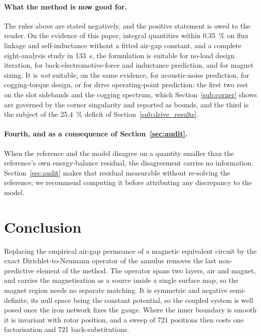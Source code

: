 \documentclass[10pt,a4paper,twocolumn]{article}
\theoremstyle{plain}
\theoremstyle{remark}
\begin{document}
\paragraph{What the method is now good for.}
The rules above are stated negatively, and the positive statement is
owed to the reader. On the evidence of this paper, integral quantities
within \SI{0.35}{\percent} on flux linkage and self-inductance without a
fitted air-gap constant, and a complete eight-analysis study in
\SI{133}{\second}, the formulation is suitable for no-load design
iteration, for back-electromotive-force and inductance prediction, and
for magnet sizing. It is \emph{not} suitable, on the same evidence, for
acoustic-noise prediction, for cogging-torque design, or for drive
operating-point prediction: the first two rest on the slot sidebands and
the cogging spectrum, which Section~\ref{sub:corner} shows are governed
by the corner singularity and reported as bounds, and the third is the
subject of the \SI{25.4}{\percent} deficit of
Section~\ref{sub:drive_results}.

\paragraph{Fourth, and as a consequence of Section~\ref{sec:audit}.}
When the reference and the model disagree on a quantity smaller than the
reference's own energy-balance residual, the disagreement carries no
information. Section~\ref{sec:audit} makes that residual measurable
without re-solving the reference; we recommend computing it before
attributing any discrepancy to the model.


\section{Conclusion}
\label{sec:conclusion}

Replacing the empirical air-gap permeance of a magnetic equivalent
circuit by the exact Dirichlet-to-Neumann operator of the annulus
removes the last non-predictive element of the method. The operator
spans two layers, air and magnet, and carries the magnetisation as a
source inside a single surface map, so the magnet region needs no
separate matching. It is symmetric and negative semi-definite, its null
space being the constant potential, so the coupled system is well posed
once the iron network fixes the gauge. Where the inner boundary is
smooth it is invariant with rotor position, and a sweep of \num{721}
positions then costs one factorisation and \num{721}
back-substitutions.
\end{document}
